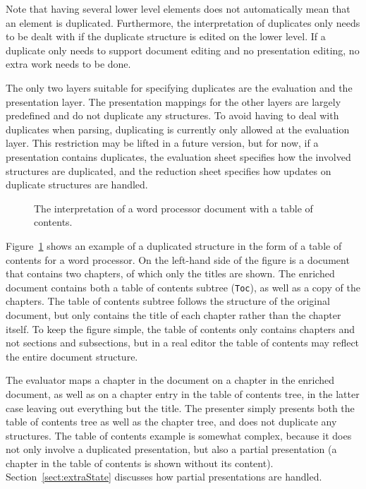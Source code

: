 Note that having several lower level elements does not automatically mean that an element is duplicated. Furthermore, the interpretation of duplicates only needs to be dealt with if the duplicate structure is edited on the lower level. If a duplicate only needs to support document editing and no presentation editing, no extra work needs to be done.

The only two layers suitable for specifying duplicates are the evaluation and the presentation layer. The presentation mappings for the other layers are largely predefined and do not duplicate any structures. To avoid having to deal with duplicates when parsing, duplicating is currently only allowed at the evaluation layer. This restriction may be lifted in a future version, but for now, if a presentation contains duplicates, the evaluation sheet specifies how the involved structures are duplicated, and the reduction sheet specifies how updates on duplicate structures are handled.

\begin{figure}
\begin{center}
\begin{center}
%
%
\end{center}
\caption{The interpretation of a word processor document with a table of contents.}\label{duplicatesExample} 
\end{center}
\end{figure}

Figure~\ref{duplicatesExample} shows an example of a duplicated structure in the form of a table of contents for a word processor. On the left-hand side of the figure is a document that contains two chapters, of which only the titles are shown. The enriched document contains both a table of contents subtree (\verb|Toc|), as well as a copy of the chapters. The table of contents subtree follows the structure of the original document, but only contains the title of each chapter rather than the chapter itself. To keep the figure simple, the table of contents only contains chapters and not sections and subsections, but in a real editor the table of contents may reflect the entire document structure. 

The evaluator maps a chapter in the document on a chapter in the enriched document, as well as on a chapter entry in the table of contents tree, in the latter case leaving out everything but the title. The presenter simply presents both the table of contents tree as well as the chapter tree, and does not duplicate any structures. The table of contents example is somewhat complex, because it does not only involve a duplicated presentation, but also a partial presentation (a chapter in the table of contents is shown without its content). Section~\ref{sect:extraState} discusses how partial presentations are handled.

